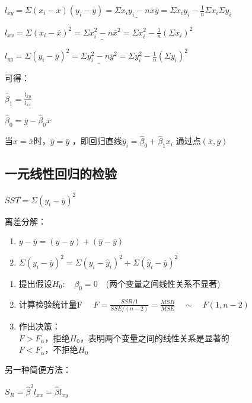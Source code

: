 \documentclass[UTF8,10pt]{book}
\begin{document}
\(  l_{xy} = \Sigma(x_i-\overline{x})(y_i-\overline{y}) = \underline{\Sigma x_i y_i - n\overline{x}\overline{y} } = \Sigma x_i y_i - \frac{1}{n}\Sigma x_i \Sigma y_i  \)

\(  l_{xx} = \Sigma (x_i - \overline{x})^2 = \underline{\Sigma x_i^2 - n \overline{x}^2}= \Sigma x_i^2 - \frac{1}{n}(\Sigma x_i)^2   \)

\(  l_{yy} = \Sigma (y_i - \overline{y})^2 =  \underline{\Sigma y_i^2 - n \overline{y}^2}= \Sigma y_i^2 - \frac{1}{n}(\Sigma y_i)^2   \)

可得：

\(  \hat{\beta}_1 = \frac{l_{xy}} { l_{xx}}  \)

\(  \hat{\beta}_0 = \overline{y} - \hat{\beta}_0 \overline{x}  \)

当\(x=\overline{x}\)时，\(\hat{y}=\overline{y}\)
，即回归直线\(\hat{y}_i=\hat{\beta}_0+\hat{\beta}_1 x_i\)
通过点\((\overline{x},\overline{y})\)

\subsection{一元线性回归的检验}\label{header-n104}

\(SST = \Sigma(y_i - \overline{y})^2\)

离差分解：

\begin{enumerate}
	\def\labelenumi{\arabic{enumi}.}
	\item
	\(   y-\overline{y} = (y-\hat{y})+(\hat{y}-\overline{y})   \) 
	\item
	\(   \Sigma (y_i-\overline{y})^2 =  \Sigma (y_i-\hat{y}_i)^2+\Sigma(\hat{y}_i-\overline{y})^2        \)
\end{enumerate}

\begin{enumerate}
	\def\labelenumi{\arabic{enumi}.}
	\item
	提出假设\(H_0 :\quad \beta_0 = 0 \quad\)(两个变量之间线性关系不显著)
	\item
	计算检验统计量F
	\(\quad F = \frac{SSR/1}{SSE/(n-2)} =\frac{MSR}{MSE} \quad \sim \quad F(1,n-2) \)
	\item
	作出决策：\\
	\(F>F_{\alpha}\)，拒绝\(H_0\)，表明两个变量之间的线性关系是显著的\\
	\(F<F_{\alpha}\)，不拒绝\(H_0\)
\end{enumerate}

另一种简便方法：

\( S_R = \hat{\beta}^2 l_{xx}=\hat{\beta}l_{xy} \)
\end{document}
